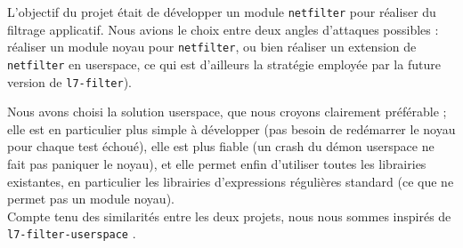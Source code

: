 L'objectif du projet était de développer un module \verb+netfilter+ pour réaliser du filtrage applicatif. Nous avions le choix entre deux angles d'attaques possibles : réaliser un module noyau pour \verb+netfilter+, ou bien réaliser un extension de \verb+netfilter+ en userspace, ce qui est d'ailleurs la stratégie employée par la future version de \verb+l7-filter+).

Nous avons choisi la solution userspace, que nous croyons clairement préférable ; elle est en particulier plus simple à développer (pas besoin de redémarrer le noyau pour chaque test échoué), elle est plus fiable (un crash du démon userspace ne fait pas paniquer le noyau), et elle permet enfin d'utiliser toutes les librairies existantes, en particulier les librairies d'expressions régulières standard (ce que ne permet pas un module noyau).\\

Compte tenu des similarités entre les deux projets, nous nous sommes inspirés de \verb+l7-filter-userspace+ \cite{RW}.
